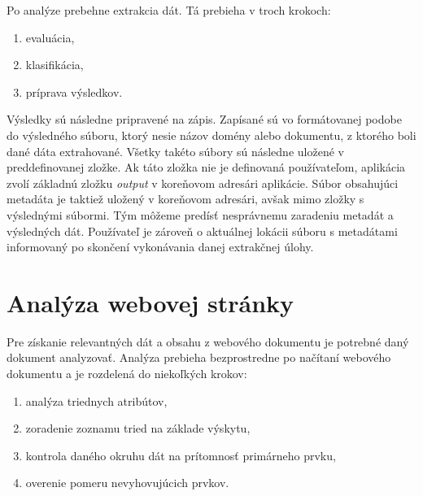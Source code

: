  Po analýze prebehne extrakcia dát. Tá prebieha v troch krokoch:
 
 \begin{enumerate}
     \item evaluácia,
     \item klasifikácia,
     \item príprava výsledkov.
 \end{enumerate}
 
 \bigskip
 
 Výsledky sú následne pripravené na zápis. Zapísané sú vo formátovanej podobe do výsledného súboru, ktorý nesie názov domény alebo dokumentu, z ktorého boli dané dáta extrahované. Všetky takéto súbory sú následne uložené v preddefinovanej zložke. Ak táto zložka nie je definovaná používateľom, aplikácia zvolí základnú zložku \textit{output} v koreňovom adresári aplikácie. Súbor obsahujúci metadáta je taktiež uložený v koreňovom adresári, avšak mimo zložky s výslednými súbormi. Tým môžeme predísť nesprávnemu zaradeniu metadát a výsledných dát. Používateľ je zároveň o aktuálnej lokácii súboru s metadátami informovaný po skončení vykonávania danej extrakčnej úlohy.
 
 \newpage
 \section{Analýza webovej stránky}
 
 Pre získanie relevantných dát a obsahu z webového dokumentu je potrebné daný dokument analyzovať. Analýza prebieha bezprostredne po načítaní webového dokumentu a je rozdelená do niekoľkých krokov:
 
 \begin{enumerate}
     \item analýza triednych atribútov,
     \item zoradenie zoznamu tried na základe výskytu,
     \item kontrola daného okruhu dát na prítomnosť primárneho prvku,
     \item overenie pomeru nevyhovujúcich prvkov.
 \end{enumerate}
 
 \bigskip
 
